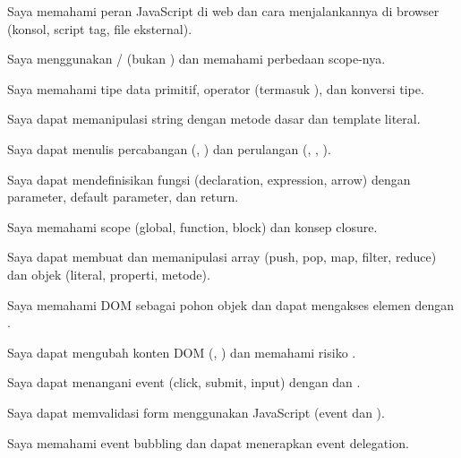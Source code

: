 \documentclass[../main.tex]{subfiles}
\begin{document}
\begin{checklist}
  \item Saya memahami peran JavaScript di web dan cara menjalankannya di browser (konsol, script tag, file eksternal).
  \item Saya menggunakan / (bukan ) dan memahami perbedaan scope-nya.
  \item Saya memahami tipe data primitif, operator (termasuk \code{===}), dan konversi tipe.
  \item Saya dapat memanipulasi string dengan metode dasar dan template literal.
  \item Saya dapat menulis percabangan (, ) dan perulangan (, , ).
  \item Saya dapat mendefinisikan fungsi (declaration, expression, arrow) dengan parameter, default parameter, dan return.
  \item Saya memahami scope (global, function, block) dan konsep closure.
  \item Saya dapat membuat dan memanipulasi array (push, pop, map, filter, reduce) dan objek (literal, properti, metode).
  \item Saya memahami DOM sebagai pohon objek dan dapat mengakses elemen dengan .
  \item Saya dapat mengubah konten DOM (, ) dan memahami risiko .
  \item Saya dapat menangani event (click, submit, input) dengan  dan .
  \item Saya dapat memvalidasi form menggunakan JavaScript (event  dan ).
  \item Saya memahami event bubbling dan dapat menerapkan event delegation.
\end{checklist}
\end{document}
